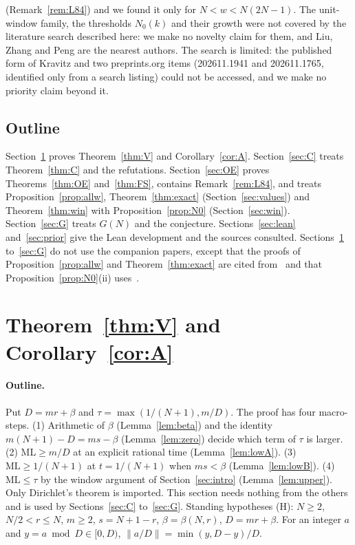 \documentclass[11pt]{article}
\theoremstyle{definition}
\theoremstyle{remark}
\newcommand{\nd}[1]{\lVert #1\rVert}
\newcommand{\ML}{\mathrm{ML}}
\begin{document}
(Remark~\ref{rem:L84}) and we found it only for $N<w<N(2N-1)$. The unit-window family, the thresholds $N_0(k)$ and their growth were not covered by the literature search described here: we make no novelty claim for them, and Liu, Zhang and Peng are the nearest authors. The search is limited: the published form of Kravitz and two preprints.org items (202611.1941 and 202611.1765, identified only from a search listing) could not be accessed, and we make no priority claim beyond it.

\subsection{Outline}
Section~\ref{sec:V} proves Theorem~\ref{thm:V} and Corollary~\ref{cor:A}. Section~\ref{sec:C} treats Theorem~\ref{thm:C} and the refutations. Section~\ref{sec:OE} proves Theorems~\ref{thm:OE} and~\ref{thm:FS}, contains Remark~\ref{rem:L84}, and treats Proposition~\ref{prop:allw}, Theorem~\ref{thm:exact} (Section~\ref{sec:values}) and Theorem~\ref{thm:win} with Proposition~\ref{prop:N0} (Section~\ref{sec:win}). Section~\ref{sec:G} treats $G(N)$ and the conjecture. Sections~\ref{sec:lean} and~\ref{sec:prior} give the Lean development and the sources consulted. Sections~\ref{sec:V} to~\ref{sec:G} do not use the companion papers, except that the proofs of Proposition~\ref{prop:allw} and Theorem~\ref{thm:exact} are cited from~\cite{A2} and that Proposition~\ref{prop:N0}(ii) uses~\cite{B}.


\section{Theorem~\ref{thm:V} and Corollary~\ref{cor:A}}\label{sec:V}

\paragraph{Outline.}
Put $D=mr+\beta$ and $\tau=\max(1/(N+1),m/D)$. The proof has four macro-steps. (1) Arithmetic of $\beta$ (Lemma~\ref{lem:beta}) and the identity $m(N+1)-D=ms-\beta$ (Lemma~\ref{lem:zero}) decide which term of $\tau$ is larger. (2) $\ML\ge m/D$ at an explicit rational time (Lemma~\ref{lem:lowA}). (3) $\ML\ge1/(N+1)$ at $t=1/(N+1)$ when $ms<\beta$ (Lemma~\ref{lem:lowB}). (4) $\ML\le\tau$ by the window argument of Section~\ref{sec:intro} (Lemma~\ref{lem:upper}). Only Dirichlet's theorem is imported. This section needs nothing from the others and is used by Sections~\ref{sec:C} to~\ref{sec:G}. Standing hypotheses (H): $N\ge2$, $N/2<r\le N$, $m\ge2$, $s=N+1-r$, $\beta=\beta(N,r)$, $D=mr+\beta$. For an integer $a$ and $y=a\bmod D\in[0,D)$, $\nd{a/D}=\min(y,D-y)/D$.
\end{document}
